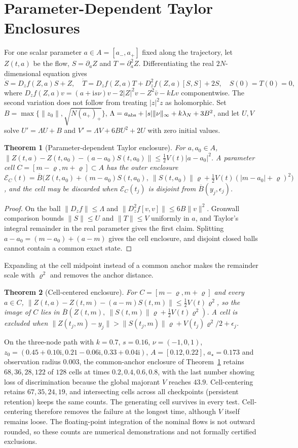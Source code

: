 \documentclass[11pt,notitlepage]{report}
\newtheorem{theorem}{Theorem}[chapter]
\theoremstyle{definition}
\theoremstyle{remark}
\newcommand{\ii}{\mathrm i}
\begin{document}
\section{Parameter-Dependent Taylor Enclosures}
For one scalar parameter $a\in A=[a_-,a_+]$ fixed along the trajectory, let $Z(t,a)$ be the flow, $S=\partial_aZ$ and $T=\partial_a^2Z$. Differentiating the real $2N$-dimensional equation gives
\[
\dot S=D_zf(Z,a)S+Z,\quad\dot T=D_zf(Z,a)T+D_z^2f(Z,a)[S,S]+2S,\quad S(0)=T(0)=0,
\]
where $D_zf(Z,a)v=(a+\ii s\nu)v-2|Z|^2v-Z^2\bar v-kLv$ componentwise. The second variation does not follow from treating $|z|^2z$ as holomorphic. Set $B=\max\{\|z_0\|,\sqrt{N(a_+)_+}\}$, $\Lambda=a_{\rm abs}+|s|\|\nu\|_\infty+k\lambda_N+3B^2$, and let $U,V$ solve $U'=\Lambda U+B$ and $V'=\Lambda V+6BU^2+2U$ with zero initial values.
\begin{theorem}[Parameter-dependent Taylor enclosure]\label{th:taylor}
For $a,a_0\in A$, $\|Z(t,a)-Z(t,a_0)-(a-a_0)S(t,a_0)\|\le\tfrac12V(t)|a-a_0|^2$. A parameter cell $C=[m-\varrho,m+\varrho]\subset A$ has the outer enclosure $\mathcal E_C(t)=\overline B\bigl(Z(t,a_0)+(m-a_0)S(t,a_0),\ \|S(t,a_0)\|\varrho+\tfrac12V(t)(|m-a_0|+\varrho)^2\bigr)$, and the cell may be discarded when $\mathcal E_C(t_j)$ is disjoint from $\overline B(y_j,\epsilon_j)$.
\end{theorem}
\begin{proof}
On the ball $\|D_zf\|\le\Lambda$ and $\|D_z^2f[v,v]\|\le6B\|v\|^2$. Gronwall comparison bounds $\|S\|\le U$ and $\|T\|\le V$ uniformly in $a$, and Taylor's integral remainder in the real parameter gives the first claim. Splitting $a-a_0=(m-a_0)+(a-m)$ gives the cell enclosure, and disjoint closed balls cannot contain a common exact state.
\end{proof}
Expanding at the cell midpoint instead of a common anchor makes the remainder scale with $\varrho^2$ and removes the anchor distance.
\begin{theorem}[Cell-centered enclosure]\label{th:cellcentered}
For $C=[m-\varrho,m+\varrho]$ and every $a\in C$, $\|Z(t,a)-Z(t,m)-(a-m)S(t,m)\|\le\tfrac12V(t)\varrho^2$, so the image of $C$ lies in $\overline B(Z(t,m),\ \|S(t,m)\|\varrho+\tfrac12V(t)\varrho^2)$. A cell is excluded when $\|Z(t_j,m)-y_j\|>\|S(t_j,m)\|\varrho+V(t_j)\varrho^2/2+\epsilon_j$.
\end{theorem}
On the three-node path with $k=0.7$, $s=0.16$, $\nu=(-1,0,1)$, $z_0=(0.45+0.10\ii,0.21-0.06\ii,0.33+0.04\ii)$, $A=[0.12,0.22]$, $a_\star=0.173$ and observation radius $0.003$, the common-anchor enclosure of Theorem~\ref{th:taylor} retains $68,36,28,122$ of $128$ cells at times $0.2,0.4,0.6,0.8$, with the last number showing loss of discrimination because the global majorant $V$ reaches $43.9$. Cell-centering retains $67,35,24,19$, and intersecting cells across all checkpoints (persistent retention) keeps the same counts. The generating cell survives in every test. Cell-centering therefore removes the failure at the longest time, although $V$ itself remains loose. The floating-point integration of the nominal flows is not outward rounded, so these counts are numerical demonstrations and not formally certified exclusions.
\end{document}

